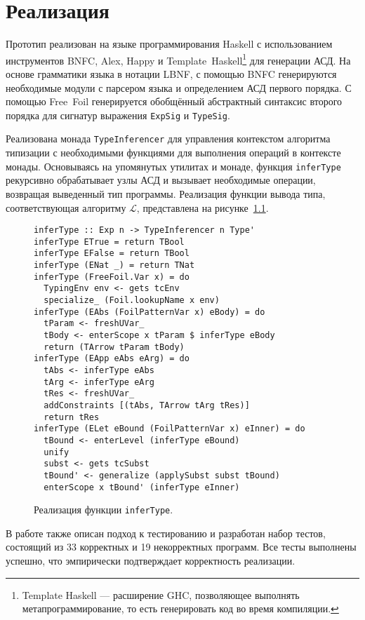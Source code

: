 \chapter{Реализация}
\label{chap:impl}

Прототип реализован на языке программирования Haskell с использованием инструментов BNFC, Alex, Happy и Template~Haskell\footnote{Template Haskell — расширение GHC, позволяющее выполнять метапрограммирование, то есть генерировать код во время компиляции.} для генерации АСД. На основе грамматики языка в нотации LBNF, с помощью BNFC генерируются необходимые модули с парсером языка и определением АСД первого порядка. С помощью Free~Foil генерируется обобщённый абстрактный синтаксис второго порядка для сигнатур выражения \texttt{ExpSig} и \texttt{TypeSig}.

Реализована монада \texttt{TypeInferencer} для управления контекстом алгоритма типизации с необходимыми функциями для выполнения операций в контексте монады. Основываясь на упомянутых утилитах и монаде, функция \texttt{inferType} рекурсивно обрабатывает узлы АСД и вызывает необходимые операции, возвращая выведенный тип программы. Реализация функции вывода типа, соответствующая алгоритму $\mathcal{L}$, представлена на рисунке~\ref{fig:inferType}.

\begin{figure}[H]
  \begin{verbatim}
inferType :: Exp n -> TypeInferencer n Type'
inferType ETrue = return TBool
inferType EFalse = return TBool
inferType (ENat _) = return TNat
inferType (FreeFoil.Var x) = do
  TypingEnv env <- gets tcEnv
  specialize_ (Foil.lookupName x env)  
inferType (EAbs (FoilPatternVar x) eBody) = do
  tParam <- freshUVar_
  tBody <- enterScope x tParam $ inferType eBody
  return (TArrow tParam tBody)
inferType (EApp eAbs eArg) = do
  tAbs <- inferType eAbs
  tArg <- inferType eArg
  tRes <- freshUVar_
  addConstraints [(tAbs, TArrow tArg tRes)]
  return tRes
inferType (ELet eBound (FoilPatternVar x) eInner) = do
  tBound <- enterLevel (inferType eBound)
  unify
  subst <- gets tcSubst
  tBound' <- generalize (applySubst subst tBound)
  enterScope x tBound' (inferType eInner)
\end{verbatim}
  \caption[Реализация \texttt{inferType}]{Реализация функции \texttt{inferType}.}
  \label{fig:inferType}
\end{figure}

В работе также описан подход к тестированию и разработан набор тестов, состоящий из 33 корректных и 19 некорректных программ. Все тесты выполнены успешно, что эмпирически подтверждает корректность реализации.
